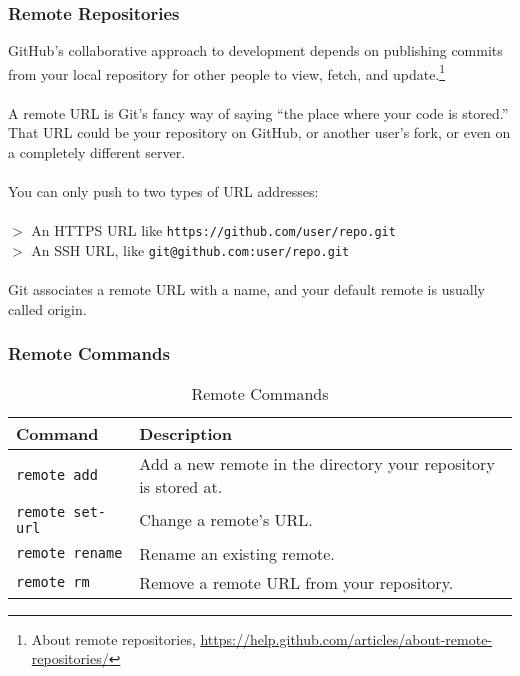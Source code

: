 \documentclass[12pt,letterpaper,dvips]{article}
\newcommand{\cmd}[1]{\texttt{#1}}
\begin{document}
\subsubsection{Remote Repositories}
GitHub's collaborative approach to development depends on
publishing commits from your local repository for other people to
view, fetch, and update.\footnote{About remote repositories,
\href{https://help.github.com/articles/about-remote-repositories/}{https://help.github.com/articles/about-remote-repositories/}}
\\
\\
A remote URL is Git's fancy way of saying ``the place where your
code is stored.'' That URL could be your repository on GitHub, or
another user's fork, or even on a completely different server.
\\
\\
You can only push to two types of URL addresses:
\\
\\
$>$ An HTTPS URL like \cmd{https://github.com/user/repo.git}\\
$>$ An SSH URL, like \cmd{git@github.com:user/repo.git}\\
\\
Git associates a remote URL with a name, and your default remote is usually called origin.


\newpage
\subsubsection{Remote Commands}
\begin{table}[htb]
\begin{center}
\begin{tabular}{|p{}|p{}|}\hline
Command&Description\\
\hline
\cmd{remote add}&Add a new remote in the directory your repository is stored at.\\
\cmd{remote set-url}&Change a remote's URL.\\
\cmd{remote rename}&Rename an existing remote.\\
\cmd{remote rm}&Remove a remote URL from your repository.\\
\hline
\end{tabular}
\caption {Remote Commands}
\label{table:remote_commands}
\end{center}
\end{table}
\end{document}
